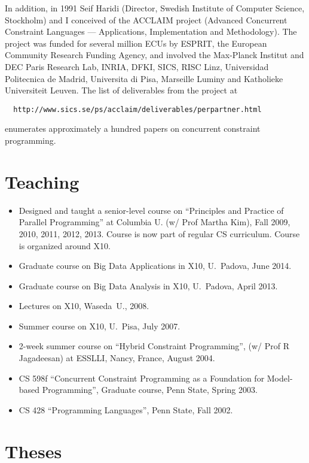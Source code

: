 \documentclass{article}
\begin{document}
In addition, in 1991 Seif Haridi (Director, Swedish Institute of
Computer Science, Stockholm) and I conceived of the \textsc{ ACCLAIM} project
(Advanced Concurrent Constraint Languages --- Applications,
Implementation and Methodology). The project was funded for several
million ECUs by ESPRIT, the European Community Research Funding
Agency, and involved the Max-Planck Institut and DEC Paris Research
Lab, INRIA, DFKI, SICS, RISC Linz, Universidad Politecnica de Madrid,
Universita di Pisa, Marseille Luminy and Katholieke Universiteit
Leuven. The list of deliverables from the project at
\begin{verbatim}
  http://www.sics.se/ps/acclaim/deliverables/perpartner.html
\end{verbatim}
enumerates approximately a hundred papers on concurrent constraint
programming.

\section*{Teaching}
\begin{itemize}
 \item Designed and taught a senior-level course on ``Principles and
   Practice of Parallel Programming'' at Columbia U. (w/ Prof Martha
   Kim), Fall 2009, 2010, 2011, 2012, 2013. Course is now part of regular CS
   curriculum. Course is organized around X10.
 \item Graduate course on Big Data Applications in X10, U.~Padova, June 2014.
 \item Graduate course on Big Data Analysis in X10, U.~Padova, April 2013.
 \item Lectures on X10, Waseda~U., 2008.
 \item Summer course on X10, U.~Pisa, July 2007.
  \item 2-week summer course on ``Hybrid Constraint Programming'', (w/
  Prof R Jagadeesan) at ESSLLI, Nancy, France, August 2004.
  \item CS 598f ``Concurrent Constraint Programming as a Foundation
  for Model-based Programming'', Graduate course, Penn State, Spring
  2003.
  \item CS 428 ``Programming Languages'', Penn State, Fall 2002.
\end{itemize}
\section*{Theses}
\end{document}

